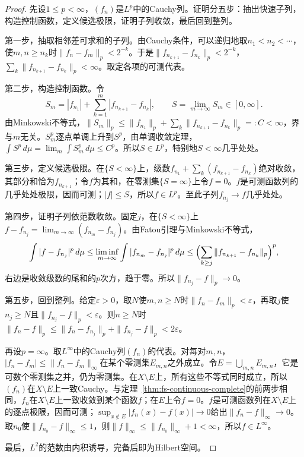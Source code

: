\begin{proof}
先设$1\leq p<\infty$，$(f_n)$是$L^p$中的Cauchy列。证明分五步：抽出快速子列，构造控制函数，定义候选极限，证明子列收敛，最后回到整列。

第一步，抽取相邻差可求和的子列。由Cauchy条件，可以递归地取$n_1<n_2<\cdots$，使$m,n\geq n_k$时$\|f_n-f_m\|_p<2^{-k}$。于是$\|f_{n_{k+1}}-f_{n_k}\|_p<2^{-k}$，$\sum_k\|f_{n_{k+1}}-f_{n_k}\|_p<\infty$。取定各项的可测代表。

第二步，构造控制函数。令
\[
 S_m=|f_{n_1}|+\sum_{k=1}^m|f_{n_{k+1}}-f_{n_k}|,\qquad S=\lim_{m\to\infty}S_m\in[0,\infty].
\]
由Minkowski不等式，$\|S_m\|_p\leq\|f_{n_1}\|_p+\sum_k\|f_{n_{k+1}}-f_{n_k}\|_p=:C<\infty$，界与$m$无关。$S_m^p$逐点单调上升到$S^p$，由单调收敛定理，$\int S^p\,d\mu=\lim_m\int S_m^p\,d\mu\leq C^p$。所以$S\in L^p$，特别地$S<\infty$几乎处处。

第三步，定义候选极限。在$\{S<\infty\}$上，级数$f_{n_1}+\sum_k(f_{n_{k+1}}-f_{n_k})$绝对收敛，其部分和恰为$f_{n_{k+1}}$；令$f$为其和，在零测集$\{S=\infty\}$上令$f=0$。$f$是可测函数列的几乎处处极限，因而可测；$|f|\leq S$，所以$f\in L^p$。至此子列$f_{n_j}\to f$几乎处处。

第四步，证明子列依范数收敛。固定$j$，在$\{S<\infty\}$上$f-f_{n_j}=\lim_{m\to\infty}(f_{n_m}-f_{n_j})$。由Fatou引理与Minkowski不等式，
\[
 \int|f-f_{n_j}|^p\,d\mu\leq\liminf_{m\to\infty}\int|f_{n_m}-f_{n_j}|^p\,d\mu
 \leq\Bigl(\sum_{k\geq j}\|f_{n_{k+1}}-f_{n_k}\|_p\Bigr)^p,
\]
右边是收敛级数的尾和的$p$次方，趋于零。所以$\|f_{n_j}-f\|_p\to0$。

第五步，回到整列。给定$\varepsilon>0$，取$N$使$m,n\geq N$时$\|f_n-f_m\|_p<\varepsilon$，再取$j$使$n_j\geq N$且$\|f_{n_j}-f\|_p<\varepsilon$。则$n\geq N$时$\|f_n-f\|_p\leq\|f_n-f_{n_j}\|_p+\|f_{n_j}-f\|_p<2\varepsilon$。

再设$p=\infty$。取$L^\infty$中的Cauchy列$(f_n)$的代表。对每对$m,n$，$|f_n-f_m|\leq\|f_n-f_m\|_\infty$在某个零测集$E_{m,n}$之外成立。令$E=\bigcup_{m,n}E_{m,n}$，它是可数个零测集之并，仍为零测集。在$X\setminus E$上，所有这些不等式同时成立，所以$(f_n)$在$X\setminus E$上一致Cauchy。与定理~\ref{thm:fs-continuous-complete}的前两步相同，$f_n$在$X\setminus E$上一致收敛到某个函数$f$；在$E$上令$f=0$。$f$是可测函数列在$X\setminus E$上的逐点极限，因而可测；$\sup_{x\notin E}|f_n(x)-f(x)|\to0$给出$\|f_n-f\|_\infty\to0$。取$n_0$使$\|f_{n_0}-f\|_\infty\leq1$，则$\|f\|_\infty\leq\|f_{n_0}\|_\infty+1<\infty$，所以$f\in L^\infty$。

最后，$L^2$的范数由内积诱导，完备后即为Hilbert空间。
\end{proof}

